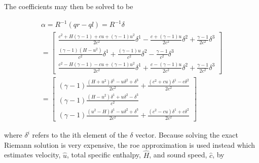 \documentclass{article}%
\numberwithin{equation}{section}
\begin{document}
The coefficients may then be solved to be

\begin{equation}
\begin{split}
\alpha = R^{-1}(qr - ql)  = R^{-1} \delta \\
= \left[ \begin{array}{c} \frac{c^2 + H (\gamma-1) + c u + (\gamma-1) u^2}{2 c^2} \delta^1 -\frac{c + (\gamma - 1) u}{2 c^2} \delta^2 +   \frac{\gamma - 1}{2 c^2} \delta^3 \\ \frac{ (\gamma - 1) (H - u^2)}{c^2} \delta^1 +  \frac{(\gamma - 1) u}{c^2} \delta^2 -  \frac{\gamma - 1}{ c^2}  \delta^3 \\ \frac{c^2 - H (\gamma - 1) - c u + (\gamma - 1) u^2}{2 c^2} \delta^1 + \frac{c - (\gamma - 1) u}{2 c^2} \delta^2 +   \frac{\gamma - 1}{2 c^2} \delta^3 \end{array} \right] \\
= \left[ \begin{array}{c} (\gamma - 1) \frac{(H + u^2) \delta^1 - u \delta^2 + \delta^3}{2 c^2} + \frac{(c^2 + c u) \delta^1 - c \delta^2}{2 c^2} \\ (\gamma - 1) \frac{(H - u^2)\delta^1 + u \delta^2 - \delta^3}{ c^2} \\ (\gamma - 1) \frac{(u^2 - H) \delta^1 - u \delta^2 + \delta^3}{2 c^2} + \frac{(c^2 - c u) \delta^1 + c \delta^2}{2 c^2} \end{array} \right]
\end{split} \label{coeffcients}
\end{equation}

where $\delta^i$ refers to the ith element of the $\delta$ vector. Because solving the exact Riemann solution is very expensive, the roe approximation is used instead which estimates velocity, $\hat{u}$, total specific enthalpy, $\hat{H}$, and sound speed, $\hat{c}$, by
\end{document}

